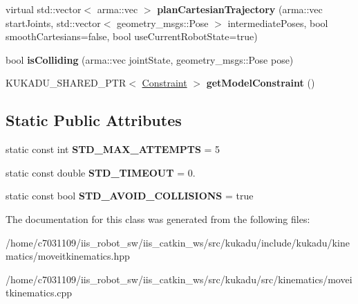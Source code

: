 \begin{DoxyCompactItemize}
\item 
\hypertarget{classkukadu_1_1MoveItKinematics_a51f3a5d4e74240413173c7e9a7c1b454}{virtual std\-::vector$<$ arma\-::vec $>$ {\bfseries plan\-Cartesian\-Trajectory} (arma\-::vec start\-Joints, std\-::vector$<$ geometry\-\_\-msgs\-::\-Pose $>$ intermediate\-Poses, bool smooth\-Cartesians=false, bool use\-Current\-Robot\-State=true)}\label{classkukadu_1_1MoveItKinematics_a51f3a5d4e74240413173c7e9a7c1b454}

\item 
\hypertarget{classkukadu_1_1MoveItKinematics_ae51321ad291b1028a08ed778e8648a69}{bool {\bfseries is\-Colliding} (arma\-::vec joint\-State, geometry\-\_\-msgs\-::\-Pose pose)}\label{classkukadu_1_1MoveItKinematics_ae51321ad291b1028a08ed778e8648a69}

\item 
\hypertarget{classkukadu_1_1MoveItKinematics_a529444d890549bcf9b6c53f94a340040}{K\-U\-K\-A\-D\-U\-\_\-\-S\-H\-A\-R\-E\-D\-\_\-\-P\-T\-R$<$ \hyperlink{classkukadu_1_1Constraint}{Constraint} $>$ {\bfseries get\-Model\-Constraint} ()}\label{classkukadu_1_1MoveItKinematics_a529444d890549bcf9b6c53f94a340040}

\end{DoxyCompactItemize}
\subsection*{Static Public Attributes}
\begin{DoxyCompactItemize}
\item 
\hypertarget{classkukadu_1_1MoveItKinematics_ae539766efac62822c841cf211c666ce1}{static const int {\bfseries S\-T\-D\-\_\-\-M\-A\-X\-\_\-\-A\-T\-T\-E\-M\-P\-T\-S} = 5}\label{classkukadu_1_1MoveItKinematics_ae539766efac62822c841cf211c666ce1}

\item 
\hypertarget{classkukadu_1_1MoveItKinematics_a5172477ff4cdf5f48bb8a2b1a2e453e8}{static const double {\bfseries S\-T\-D\-\_\-\-T\-I\-M\-E\-O\-U\-T} = 0.}\label{classkukadu_1_1MoveItKinematics_a5172477ff4cdf5f48bb8a2b1a2e453e8}

\item 
\hypertarget{classkukadu_1_1MoveItKinematics_af3bfbf694219dc9784ffd78093d32913}{static const bool {\bfseries S\-T\-D\-\_\-\-A\-V\-O\-I\-D\-\_\-\-C\-O\-L\-L\-I\-S\-I\-O\-N\-S} = true}\label{classkukadu_1_1MoveItKinematics_af3bfbf694219dc9784ffd78093d32913}

\end{DoxyCompactItemize}


The documentation for this class was generated from the following files\-:\begin{DoxyCompactItemize}
\item 
/home/c7031109/iis\-\_\-robot\-\_\-sw/iis\-\_\-catkin\-\_\-ws/src/kukadu/include/kukadu/kinematics/moveitkinematics.\-hpp\item 
/home/c7031109/iis\-\_\-robot\-\_\-sw/iis\-\_\-catkin\-\_\-ws/src/kukadu/src/kinematics/moveitkinematics.\-cpp\end{DoxyCompactItemize}
